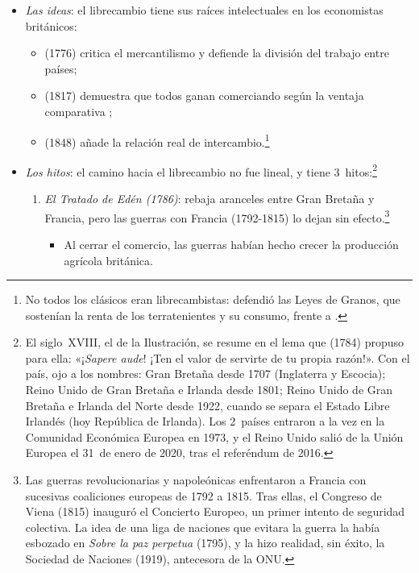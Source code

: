 \documentclass[11pt]{article}
\begin{document}
\begin{itemize}
\item \emph{Las ideas}: el librecambio tiene sus raíces intelectuales en los economistas británicos:
  \begin{itemize}
  \item {} (1776) critica el mercantilismo y defiende la división del trabajo entre países\nocite{Smith1776Wealth};
  \item {} (1817) demuestra que todos ganan comerciando según la ventaja comparativa ;
  \item {} (1848) añade la relación real de intercambio.\footnote{No todos los clásicos eran librecambistas:  defendió las Leyes de Granos, que sostenían la renta de los terratenientes y su consumo, frente a \nocite{Malthus1798Essay} .}
  \end{itemize}
\item \emph{Los hitos}: el camino hacia el librecambio no fue lineal, y tiene 3~hitos:\footnote{El siglo~XVIII, el de la Ilustración, se resume en el lema que  (1784) propuso para ella: «¡\emph{Sapere aude}! ¡Ten el valor de servirte de tu propia razón!». Con el país, ojo a los nombres: Gran Bretaña desde 1707 (Inglaterra y Escocia); Reino Unido de Gran Bretaña e Irlanda desde 1801; Reino Unido de Gran Bretaña e Irlanda del Norte desde 1922, cuando se separa el Estado Libre Irlandés (hoy República de Irlanda). Los 2~países entraron a la vez en la Comunidad Económica Europea en 1973, y el Reino Unido salió de la Unión Europea el 31~de enero de 2020, tras el referéndum de 2016.}
  \begin{enumerate}
  \item \emph{El Tratado de Edén (1786)}: rebaja aranceles entre Gran Bretaña y Francia, pero las guerras con Francia (1792-1815) lo dejan sin efecto.\footnote{Las guerras revolucionarias y napoleónicas enfrentaron a Francia con sucesivas coaliciones europeas de 1792 a 1815. Tras ellas, el Congreso de Viena (1815) inauguró el Concierto Europeo, un primer intento de seguridad colectiva. La idea de una liga de naciones que evitara la guerra la había esbozado  en \emph{Sobre la paz perpetua} (1795), y la hizo realidad, sin éxito, la Sociedad de Naciones (1919), antecesora de la ONU.}
    \begin{itemize}
    \item Al cerrar el comercio, las guerras habían hecho crecer la producción agrícola británica.

\end{itemize}
\end{enumerate}
\end{itemize}
\end{document}
